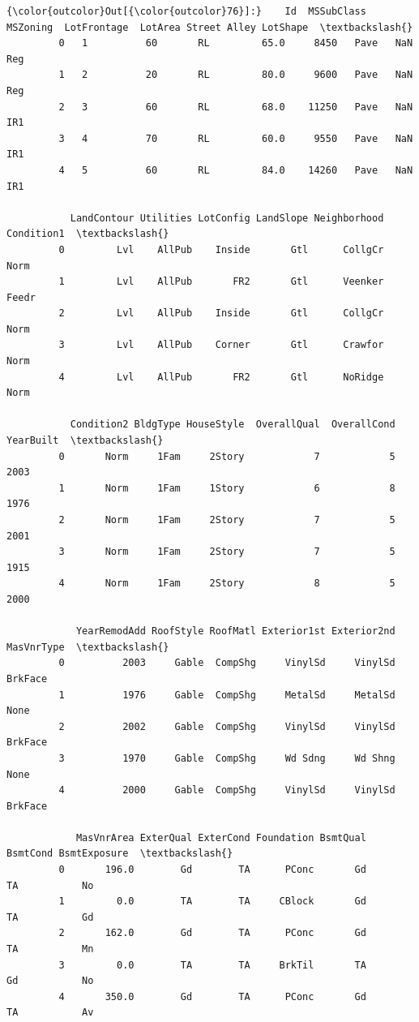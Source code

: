 \documentclass[11pt, a4paper , landscape]{article}
\begin{document}
\begin{Verbatim}[commandchars=\\\{\}]
{\color{outcolor}Out[{\color{outcolor}76}]:}    Id  MSSubClass MSZoning  LotFrontage  LotArea Street Alley LotShape  \textbackslash{}
         0   1          60       RL         65.0     8450   Pave   NaN      Reg   
         1   2          20       RL         80.0     9600   Pave   NaN      Reg   
         2   3          60       RL         68.0    11250   Pave   NaN      IR1   
         3   4          70       RL         60.0     9550   Pave   NaN      IR1   
         4   5          60       RL         84.0    14260   Pave   NaN      IR1   
         
           LandContour Utilities LotConfig LandSlope Neighborhood Condition1  \textbackslash{}
         0         Lvl    AllPub    Inside       Gtl      CollgCr       Norm   
         1         Lvl    AllPub       FR2       Gtl      Veenker      Feedr   
         2         Lvl    AllPub    Inside       Gtl      CollgCr       Norm   
         3         Lvl    AllPub    Corner       Gtl      Crawfor       Norm   
         4         Lvl    AllPub       FR2       Gtl      NoRidge       Norm   
         
           Condition2 BldgType HouseStyle  OverallQual  OverallCond  YearBuilt  \textbackslash{}
         0       Norm     1Fam     2Story            7            5       2003   
         1       Norm     1Fam     1Story            6            8       1976   
         2       Norm     1Fam     2Story            7            5       2001   
         3       Norm     1Fam     2Story            7            5       1915   
         4       Norm     1Fam     2Story            8            5       2000   
         
            YearRemodAdd RoofStyle RoofMatl Exterior1st Exterior2nd MasVnrType  \textbackslash{}
         0          2003     Gable  CompShg     VinylSd     VinylSd    BrkFace   
         1          1976     Gable  CompShg     MetalSd     MetalSd       None   
         2          2002     Gable  CompShg     VinylSd     VinylSd    BrkFace   
         3          1970     Gable  CompShg     Wd Sdng     Wd Shng       None   
         4          2000     Gable  CompShg     VinylSd     VinylSd    BrkFace   
         
            MasVnrArea ExterQual ExterCond Foundation BsmtQual BsmtCond BsmtExposure  \textbackslash{}
         0       196.0        Gd        TA      PConc       Gd       TA           No   
         1         0.0        TA        TA     CBlock       Gd       TA           Gd   
         2       162.0        Gd        TA      PConc       Gd       TA           Mn   
         3         0.0        TA        TA     BrkTil       TA       Gd           No   
         4       350.0        Gd        TA      PConc       Gd       TA           Av   
         

\end{Verbatim}
\end{document}
